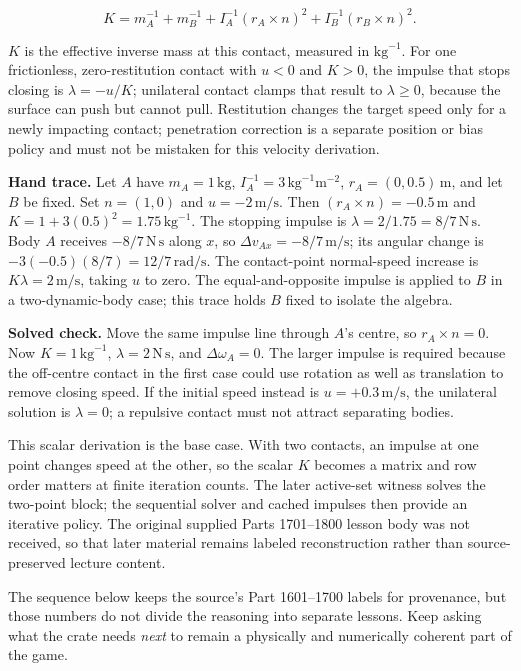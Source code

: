 \[
K=m_A^{-1}+m_B^{-1}+I_A^{-1}(r_A\times n)^2+I_B^{-1}(r_B\times n)^2.
\]

\(K\) is the effective inverse mass at this contact, measured in \(\mathrm{kg}^{-1}\). For one frictionless, zero-restitution contact with \(u<0\) and \(K>0\), the impulse that stops closing is \(\lambda=-u/K\); unilateral contact clamps that result to \(\lambda\ge0\), because the surface can push but cannot pull. Restitution changes the target speed only for a newly impacting contact; penetration correction is a separate position or bias policy and must not be mistaken for this velocity derivation.

\textbf{Hand trace.} Let \(A\) have \(m_A=1\,\mathrm{kg}\), \(I_A^{-1}=3\,\mathrm{kg}^{-1}\mathrm m^{-2}\), \(r_A=(0,0.5)\,\mathrm m\), and let \(B\) be fixed. Set \(n=(1,0)\) and \(u=-2\,\mathrm{m/s}\). Then \((r_A\times n)=-0.5\,\mathrm m\) and \(K=1+3(0.5)^2=1.75\,\mathrm{kg}^{-1}\). The stopping impulse is \(\lambda=2/1.75=8/7\,\mathrm{N\,s}\). Body \(A\) receives \(-8/7\,\mathrm{N\,s}\) along \(x\), so \(\Delta v_{Ax}=-8/7\,\mathrm{m/s}\); its angular change is \(-3(-0.5)(8/7)=12/7\,\mathrm{rad/s}\). The contact-point normal-speed increase is \(K\lambda=2\,\mathrm{m/s}\), taking \(u\) to zero. The equal-and-opposite impulse is applied to \(B\) in a two-dynamic-body case; this trace holds \(B\) fixed to isolate the algebra.

\textbf{Solved check.} Move the same impulse line through \(A\)'s centre, so \(r_A\times n=0\). Now \(K=1\,\mathrm{kg}^{-1}\), \(\lambda=2\,\mathrm{N\,s}\), and \(\Delta\omega_A=0\). The larger impulse is required because the off-centre contact in the first case could use rotation as well as translation to remove closing speed. If the initial speed instead is \(u=+0.3\,\mathrm{m/s}\), the unilateral solution is \(\lambda=0\); a repulsive contact must not attract separating bodies.

This scalar derivation is the base case. With two contacts, an impulse at one point changes speed at the other, so the scalar \(K\) becomes a matrix and row order matters at finite iteration counts. The later active-set witness solves the two-point block; the sequential solver and cached impulses then provide an iterative policy. The original supplied Parts 1701--1800 lesson body was not received, so that later material remains labeled reconstruction rather than source-preserved lecture content.

The sequence below keeps the source's Part 1601--1700 labels for provenance, but those numbers do not divide the reasoning into separate lessons. Keep asking what the crate needs \emph{next} to remain a physically and numerically coherent part of the game.

